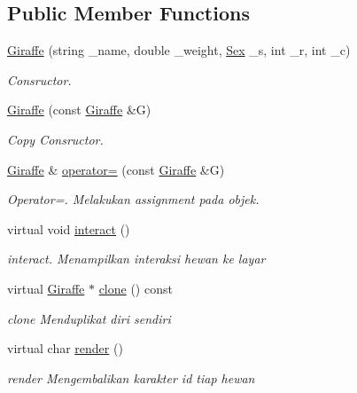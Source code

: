 \subsection*{Public Member Functions}
\begin{DoxyCompactItemize}
\item 
\hyperlink{classGiraffe_a9035d9accbc1aa1aba873b5f1ab7f350}{Giraffe} (string \+\_\+name, double \+\_\+weight, \hyperlink{sex_8h_a2633cb393c68bb2ee8080db58fb7ba93}{Sex} \+\_\+s, int \+\_\+r, int \+\_\+c)
\begin{DoxyCompactList}\small\item\em Consructor. \end{DoxyCompactList}\item 
\hyperlink{classGiraffe_ad0e9bb43e9f3ff379e21d70e6c9656ee}{Giraffe} (const \hyperlink{classGiraffe}{Giraffe} \&G)
\begin{DoxyCompactList}\small\item\em Copy Consructor. \end{DoxyCompactList}\item 
\hyperlink{classGiraffe}{Giraffe} \& \hyperlink{classGiraffe_a11f42a66f815b024ffa71f65934a1621}{operator=} (const \hyperlink{classGiraffe}{Giraffe} \&G)
\begin{DoxyCompactList}\small\item\em Operator=. Melakukan assignment pada objek. \end{DoxyCompactList}\item 
virtual void \hyperlink{classGiraffe_a70da7b25c32699f3b2a2bc85cd61b2e0}{interact} ()
\begin{DoxyCompactList}\small\item\em interact. Menampilkan interaksi hewan ke layar \end{DoxyCompactList}\item 
virtual \hyperlink{classGiraffe}{Giraffe} $\ast$ \hyperlink{classGiraffe_a37a4621ceb9515e1069a691971c4a31b}{clone} () const 
\begin{DoxyCompactList}\small\item\em clone Menduplikat diri sendiri \end{DoxyCompactList}\item 
virtual char \hyperlink{classGiraffe_a4dc522e81fb41129ecc73861180194ca}{render} ()
\begin{DoxyCompactList}\small\item\em render Mengembalikan karakter id tiap hewan \end{DoxyCompactList}\item 

\end{DoxyCompactItemize}
